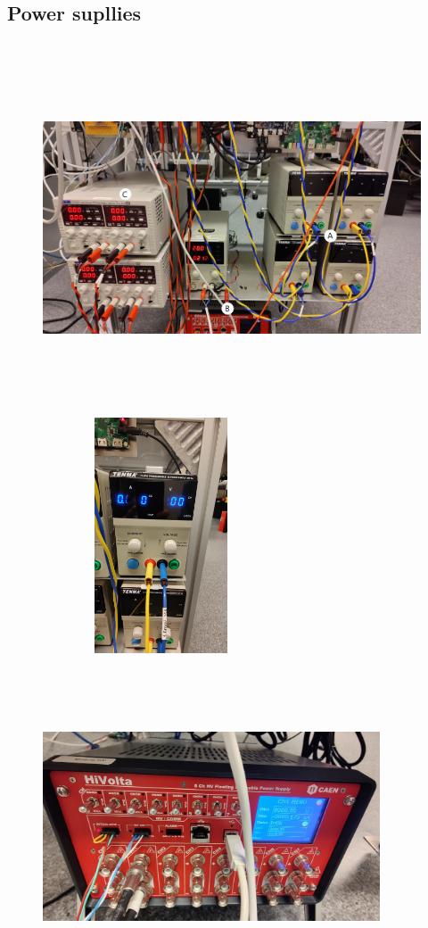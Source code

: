 \subsection{Power supllies}
\begin{figure}[h]
    \centering
    \includegraphics[width=14cm,height=11cm,keepaspectratio]{Figures/test/p-supplies.jpg}
    \includegraphics[width=7cm,height=7cm,keepaspectratio]{Figures/test/LV.jpg}
    \includegraphics[width=10cm,height=10cm,keepaspectratio]{Figures/test/HV.jpg}
    

\end{figure}

